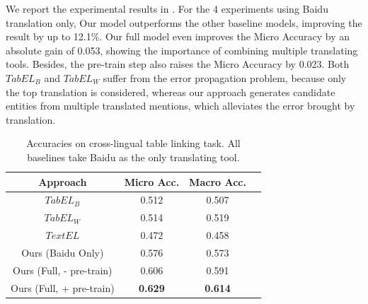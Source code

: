 We report the experimental results in .
For the 4 experiments using Baidu translation only, 
Our model outperforms the other baseline models, improving the result by up to 12.1\%.
Our full model even improves the Micro Accuracy by an absolute gain of 0.053,
showing the importance of combining multiple translating tools.
Besides, the pre-train step also raises the Micro Accuracy by 0.023.
Both $TabEL_B$ and $TabEL_W$ suffer from the error propagation problem,%
because only the top translation is considered,
whereas our approach generates candidate entities from multiple translated mentions,
which alleviates the error brought by translation.



\begin{table}[ht]
\small
\centering
\caption{Accuracies on cross-lingual table linking task.
All baselines take Baidu as the only translating tool.}
\label{tab:main-result}
\begin{tabular} {c|c|cc}
    \hline
    Approach          & Micro Acc.   & Macro Acc.    \\
    \hline
    $TabEL_B$         &  0.512       & 0.507         \\
    $TabEL_W$         &  0.514       & 0.519         \\     %
    $TextEL$          &  0.472       & 0.458         \\
    Ours (Baidu Only) &  0.576       & 0.573         \\
    \hline
    Ours (Full, - pre-train) &  0.606    &  0.591        \\ 
    Ours (Full, + pre-train)  &  \textbf{0.629}       & \textbf{0.614}         \\
    \hline
\end{tabular}
\end{table}

